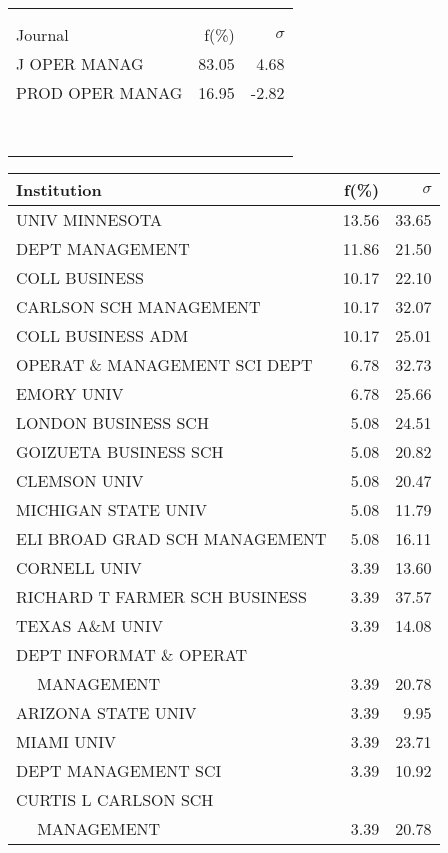 \documentclass[a4paper,11pt]{report}
\begin{document}
\begin{landscape}
\begin{table}[!ht]
{\begin{tabular}{|l r r|}
 &  & \\
 &  & \\
\hline
\hline
Journal & f(\%) & $\sigma$\\
\hline
J OPER MANAG & 83.05 & 4.68\\
PROD OPER MANAG & 16.95 & -2.82\\
 &  & \\
 &  & \\
 &  & \\
 &  & \\
 &  & \\
 &  & \\
 &  & \\
 &  & \\
\hline
\end{tabular}
}
{\scriptsize\begin{tabular}{|l r r|}
\hline
Institution & f(\%) & $\sigma$\\
\hline
UNIV MINNESOTA & 13.56 & 33.65\\
DEPT MANAGEMENT & 11.86 & 21.50\\
COLL BUSINESS & 10.17 & 22.10\\
CARLSON SCH MANAGEMENT & 10.17 & 32.07\\
COLL BUSINESS ADM & 10.17 & 25.01\\
OPERAT \& MANAGEMENT SCI DEPT & 6.78 & 32.73\\
EMORY UNIV & 6.78 & 25.66\\
LONDON BUSINESS SCH & 5.08 & 24.51\\
GOIZUETA BUSINESS SCH & 5.08 & 20.82\\
CLEMSON UNIV & 5.08 & 20.47\\
MICHIGAN STATE UNIV & 5.08 & 11.79\\
ELI BROAD GRAD SCH MANAGEMENT & 5.08 & 16.11\\
CORNELL UNIV & 3.39 & 13.60\\
RICHARD T FARMER SCH BUSINESS & 3.39 & 37.57\\
TEXAS A\&M UNIV & 3.39 & 14.08\\
DEPT INFORMAT \& OPERAT &  & \\
$\quad$ MANAGEMENT & 3.39 & 20.78\\
ARIZONA STATE UNIV & 3.39 & 9.95\\
MIAMI UNIV & 3.39 & 23.71\\
DEPT MANAGEMENT SCI & 3.39 & 10.92\\
CURTIS L CARLSON SCH &  & \\
$\quad$ MANAGEMENT & 3.39 & 20.78\\

\end{tabular}}
\end{table}
\end{landscape}
\end{document}
